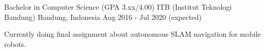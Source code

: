 

\begin{cventries}

  \cventry
    {Bachelor in Computer Science (GPA 3.xx/4.00)} %
    {ITB (Institut Teknologi Bandung)} %
    {Bandung, Indonesia} %
    {Aug 2016 - Jul 2020 (expected)} %
    {
   	  \begin{cvitems}
		  \item {Currently doing final assignment about autonomous SLAM navigation for mobile robots.}
   	  \end{cvitems}
    }

\end{cventries}
